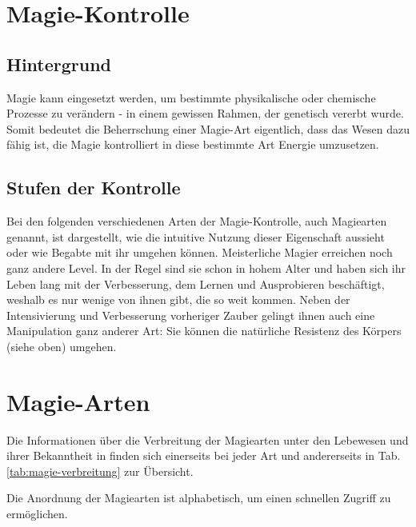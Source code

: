 \section{Magie-Kontrolle}
\subsection{Hintergrund}
Magie kann eingesetzt werden, um bestimmte physikalische oder chemische Prozesse zu verändern - in einem gewissen Rahmen, der genetisch vererbt wurde.
Somit bedeutet die Beherrschung einer Magie-Art eigentlich, dass das Wesen dazu fähig ist, die Magie kontrolliert in diese bestimmte Art Energie umzusetzen.

\subsection{Stufen der Kontrolle}
Bei den folgenden verschiedenen Arten der Magie-Kontrolle, auch Magiearten genannt, ist dargestellt, wie die intuitive Nutzung dieser Eigenschaft aussieht oder wie Begabte mit ihr umgehen können.
Meisterliche Magier erreichen noch ganz andere Level. 
In der Regel sind sie schon in hohem Alter und haben sich ihr Leben lang mit der Verbesserung, dem Lernen und Ausprobieren beschäftigt, weshalb es nur wenige von ihnen gibt, die so weit kommen. 
Neben der Intensivierung und Verbesserung vorheriger Zauber gelingt ihnen auch eine Manipulation ganz anderer Art: 
Sie können die natürliche Resistenz des Körpers (siehe oben) umgehen.



\section{Magie-Arten}
Die Informationen über die Verbreitung der Magiearten unter den Lebewesen und ihrer Bekanntheit in  finden sich einerseits bei jeder Art und andererseits in Tab. \ref{tab:magie-verbreitung} zur Übersicht. 

Die Anordnung der Magiearten ist alphabetisch, um einen schnellen Zugriff zu ermöglichen.

